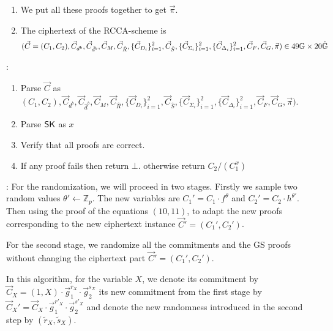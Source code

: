 \begin{description}
\begin{enumerate}
    
  \item We put all these proofs together to get $\vec{\pi}$.
  \item The ciphertext of the RCCA-scheme is
    $$(\vec{C} = (C_1, C_2), \vec{C}_{d^b}, \vec{C}_{\hat{d}^b}, \vec{C}_{M}, \vec{C}_{\hat{R}}, \{\vec{C}_{D_i}\}_{i = 1}^2, \vec{C}_{\hat{S}}, \{\vec{C}_{\Sigma_i}\}_{i = 1}^2,\{\vec{C}_{\Delta_i}\}_{i=1}^2, \vec{C}_F, \vec{C}_G, \vec{\pi}) \in 49\mathbb{G} \times 20 \hat{\mathbb{G}}$$
    
  \end{enumerate}

\item[\boldmath{$RCCA3.\Dec(\PK,\SK, \vec{C})$}]:
  \begin{enumerate}
  \item Parse $\vec{C}$ as $(C_1, C_2), \vec{C}_{d^b}, \vec{C}_{\hat{d}^b}, \vec{C}_{M}, \vec{C}_{\hat{R}}, \{\vec{C}_{D_i}\}_{i = 1}^2, \vec{C}_{\hat{S}}, \{\vec{C}_{\Sigma_i}\}_{i = 1}^2,\{\vec{C}_{\Delta_i}\}_{i=1}^2, \vec{C}_F, \vec{C}_G, \vec{\pi})$.
  \item Parse $\mathsf{SK}$ as $x$
  \item Verify that all proofs are correct.
  \item If any proof fails then return $\bot$. otherwise return $C_2/(C_1^x)$ 
  \end{enumerate}

\item[\boldmath{$RCCA3.\Rerand(\PK, \vec{C}, )$}]:  
  For the randomization, we will proceed in two stages. Firstly we sample two random values $\theta' \gets \mathbb{Z}_p$. The new variables are $C_1' = C_1 \cdot f^{\theta}$ and $C_2' = C_2 \cdot h^{\theta'}$. Then using the proof of the equations $(10, 11)$, to adapt the new proofs corresponding to the new ciphertext instance $\vec{C}' = (C_1', C_2')$.

  
For the second stage, we randomize all the commitments and the GS proofs without changing the ciphertext part $\vec{C}' = (C_1', C_2')$.

In this algorithm, for the variable $X$, we denote its commitment by $\vec{C}_X = (1, X) \cdot \vec{g}_1^{r_X} \cdot \vec{g}_2^{s_X}$ its new commitment from the first stage by $\vec{C}_X' = \vec{C}_X \cdot \vec{g}_1^{r'_X} \cdot \vec{g}_2^{s'_X}$ and denote the new randomness introduced in the second step by $(\tilde{r}_X, \tilde{s}_X)$.



\end{description}


%

